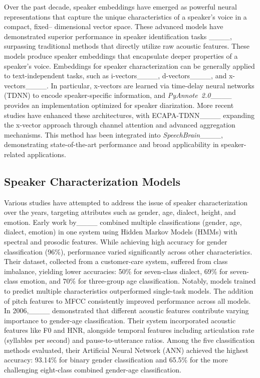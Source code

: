 Over the past decade, speaker embeddings have emerged as powerful neural representations that capture the unique characteristics of a speaker's voice in a compact, fixed--
dimensional vector space. These advanced models have demonstrated superior performance in speaker identification tasks ____, surpassing traditional methods that directly utilize raw acoustic features. These models produce speaker embeddings that encapsulate deeper properties of a speaker's voice. Embeddings for speaker characterization can be generally applied to text-independent tasks, such as i-vectors____, d-vectors____, and x-vectors____. In particular, x-vectors are learned via time-delay neural networks (TDNN) to encode speaker-specific information, and \textit{PyAnnote~2.0}____ provides an implementation optimized for speaker diarization. 
More recent studies have enhanced these architectures, with ECAPA-TDNN____ 
expanding the x-vector approach through channel attention and advanced aggregation mechanisms. This method has been integrated into \textit{SpeechBrain}____, demonstrating state-of-the-art performance and broad applicability in speaker-related applications.

\subsection{Speaker Characterization Models}
\label{ssec:model_inf}

Various studies have attempted to address the issue of speaker characterization over the years, targeting attributes such as gender, age, dialect, height, and emotion. Early work by____ combined multiple classifications (gender, age, dialect, emotion) in one system using Hidden Markov Models (HMMs) with spectral and prosodic features. While achieving high accuracy for gender classification (96\%), performance varied significantly across other characteristics. Their dataset, collected from a customer-care system, suffered from class imbalance, yielding lower accuracies: 50\% for seven-class dialect, 69\% for seven-class emotion, and 70\% for three-group age classification. Notably, models trained to predict multiple characteristics outperformed single-task models. The addition of pitch features to MFCC consistently improved performance across all models.
In 2006,____ demonstrated that different acoustic features contribute varying importance to gender-age classification. Their system incorporated acoustic features like F0 and HNR, alongside temporal features including articulation rate (syllables per second) and pause-to-utterance ratios. Among the five classification methods evaluated, their Artificial Neural Network (ANN) achieved the highest accuracy: 93.14\% for binary gender classification and 65.5\% for the more challenging eight-class combined gender-age classification.

